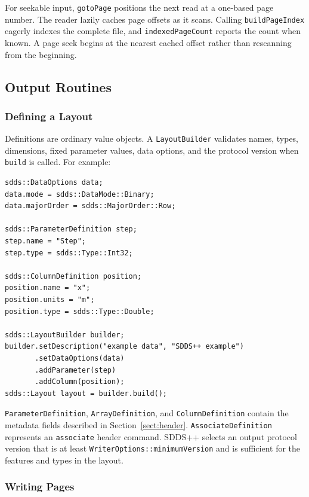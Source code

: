 \documentclass[11pt]{article}
\begin{document}
For seekable input, {\tt gotoPage} positions the next read at a one-based page
number.  The reader lazily caches page offsets as it scans.  Calling
{\tt buildPageIndex} eagerly indexes the complete file, and
{\tt indexedPageCount} reports the count when known.  A page seek begins at the
nearest cached offset rather than rescanning from the beginning.

\subsection{Output Routines}

\subsubsection{Defining a Layout}

Definitions are ordinary value objects.  A {\tt LayoutBuilder} validates names,
types, dimensions, fixed parameter values, data options, and the protocol
version when {\tt build} is called.  For example:

\begin{verbatim}
sdds::DataOptions data;
data.mode = sdds::DataMode::Binary;
data.majorOrder = sdds::MajorOrder::Row;

sdds::ParameterDefinition step;
step.name = "Step";
step.type = sdds::Type::Int32;

sdds::ColumnDefinition position;
position.name = "x";
position.units = "m";
position.type = sdds::Type::Double;

sdds::LayoutBuilder builder;
builder.setDescription("example data", "SDDS++ example")
       .setDataOptions(data)
       .addParameter(step)
       .addColumn(position);
sdds::Layout layout = builder.build();
\end{verbatim}

{\tt ParameterDefinition}, {\tt ArrayDefinition}, and
{\tt ColumnDefinition} contain the metadata fields described in
Section~\ref{sect:header}.  {\tt AssociateDefinition} represents an
{\tt associate} header command.  SDDS++ selects an output protocol version that
is at least {\tt WriterOptions::minimumVersion} and is sufficient for the
features and types in the layout.

\subsubsection{Writing Pages}
\end{document}
